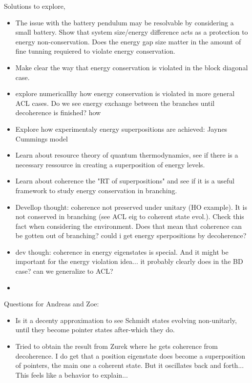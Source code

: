 \documentclass{article}
\begin{document}
Solutions to explore,
\begin{itemize}
    \item The issue with the battery pendulum may be resolvable by considering a small battery. Show that system size/energy difference acts as a protection to energy non-conservation. Does the energy gap size matter in the amount of fine tunning requiered to violate energy conservation.
    \item Make clear the way that energy conservation is violated in the block diagonal case. 
    \item explore numericallhy how energy conservation is violated in more general ACL cases. Do we see energy exchange between the branches until decoherence is finished? how
    \item Explore how experimentaly energy superpositions are achieved: Jaynes Cummings model
    \item Learn about resource theory of quantum thermodynamics, see if there is a necessary ressource in creating a superposition of energy levels.
    \item Learn about coherence the "RT of superpositions" and see if it is a useful framework to study energy conservation in branching.
    \item Devellop thought: coherence not preserved under unitary (HO example). It is not conserved in branching (see ACL eig to coherent state evol.). Check this fact when considering the environment. Does that mean that coherence can be gotten out of branching? could i get energy sperpositions by decoherence? 
    \item dev though: coherence in energy eigenstates is special. And it might be important for the energy violation idea... it probably clearly does in the BD case? can we generalize to ACL?
    \item 
\end{itemize}

Questions for Andreas and Zoe:
\begin{itemize}
    \item Is it a decenty approximation to see Schmidt states evolving non-unitarly, until they become pointer states after-which they do. 
    \item Tried to obtain the result from Zurek where he gets coherence from decoherence. I do get that a position eigenstate does become a superposition of pointers, the main one a coherent state. But it oscillates back and forth... This feels like a behavior to explain...
\end{itemize}
\end{document}
